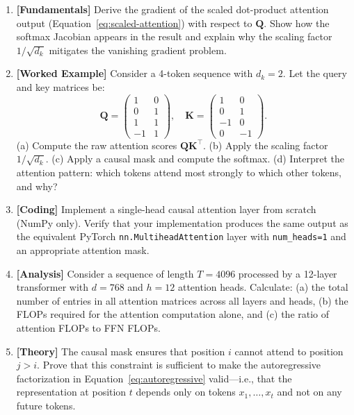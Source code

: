 \begin{enumerate}[label=\textbf{5.\arabic*.}, leftmargin=2.5em]

\item \textbf{[Fundamentals]} Derive the gradient of the scaled dot-product attention output (Equation~\ref{eq:scaled-attention}) with respect to $\mathbf{Q}$. Show how the softmax Jacobian appears in the result and explain why the scaling factor $1/\sqrt{d_k}$ mitigates the vanishing gradient problem.

\item \textbf{[Worked Example]} Consider a 4-token sequence with $d_k = 2$. Let the query and key matrices be:
\begin{equation}
\mathbf{Q} = \begin{pmatrix} 1 & 0 \\ 0 & 1 \\ 1 & 1 \\ -1 & 1 \end{pmatrix}, \quad
\mathbf{K} = \begin{pmatrix} 1 & 0 \\ 0 & 1 \\ -1 & 0 \\ 0 & -1 \end{pmatrix}.
\end{equation}
(a) Compute the raw attention scores $\mathbf{Q}\mathbf{K}^\top$.
(b) Apply the scaling factor $1/\sqrt{d_k}$.
(c) Apply a causal mask and compute the softmax.
(d) Interpret the attention pattern: which tokens attend most strongly to which other tokens, and why?

\item \textbf{[Coding]} Implement a single-head causal attention layer from scratch (NumPy only). Verify that your implementation produces the same output as the equivalent PyTorch \texttt{nn.MultiheadAttention} layer with \texttt{num\_heads=1} and an appropriate attention mask.

\item \textbf{[Analysis]} Consider a sequence of length $T = 4096$ processed by a 12-layer transformer with $d = 768$ and $h = 12$ attention heads. Calculate: (a) the total number of entries in all attention matrices across all layers and heads, (b) the FLOPs required for the attention computation alone, and (c) the ratio of attention FLOPs to FFN FLOPs.

\item \textbf{[Theory]} The causal mask ensures that position $i$ cannot attend to position $j > i$. Prove that this constraint is sufficient to make the autoregressive factorization in Equation~\ref{eq:autoregressive} valid---i.e., that the representation at position $t$ depends only on tokens $x_1, \ldots, x_t$ and not on any future tokens.


\end{enumerate}
